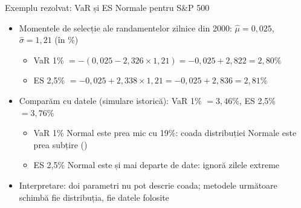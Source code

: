 \begin{frame}{Exemplu rezolvat: VaR și ES Normale pentru S\&P 500}
\itemsize{\small}
\begin{itemize}
    \item Momentele de selecție ale randamentelor zilnice din 2000: $\hat\mu = 0{,}025$, $\hat\sigma = 1{,}21$ (în \%)
    \begin{itemize}
        \item VaR 1\% $= -(0{,}025 - 2{,}326 \times 1{,}21) = -0{,}025 + 2{,}822 = 2{,}80\%$
        \item ES 2,5\% $= -0{,}025 + 2{,}338 \times 1{,}21 = -0{,}025 + 2{,}836 = 2{,}81\%$
    \end{itemize}
    \item Comparăm cu datele (simulare istorică): VaR 1\% $= 3{,}46\%$, ES 2,5\% $= 3{,}76\%$
    \begin{itemize}
        \item VaR 1\% Normal este prea mic cu 19\%: coada distribuției Normale este prea subțire ()
        \item ES 2,5\% Normal este și mai departe de date: ignoră zilele extreme
    \end{itemize}
    \item Interpretare: doi parametri nu pot descrie coada; metodele următoare schimbă fie distribuția, fie datele folosite
\end{itemize}
\end{frame}

